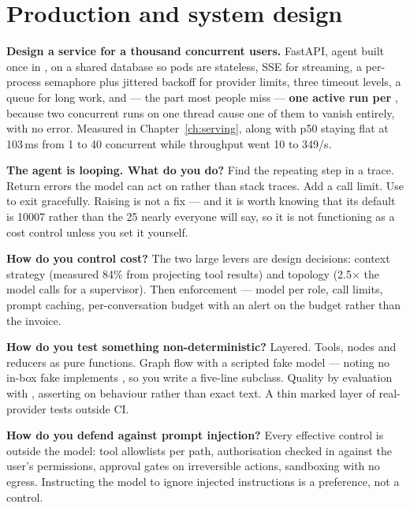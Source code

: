 \section{Production and system design}
\label{sec:appD-production}

\textbf{Design a service for a thousand concurrent users.} FastAPI, agent built
once in ,  on a shared database so pods
are stateless, SSE for streaming, a per-process semaphore plus jittered backoff
for provider limits, three timeout levels, a queue for long work, and --- the
part most people miss --- \textbf{one active run per }, because
two concurrent runs on one thread cause one of them to vanish entirely, with no
error. Measured in Chapter~\ref{ch:serving}, along with p50 staying flat at
103\,ms from 1 to 40 concurrent while throughput went 10 to 349/s.

\textbf{The agent is looping. What do you do?} Find the repeating step in a
trace. Return errors the model can act on rather than stack traces. Add a call
limit. Use  to exit gracefully. Raising
 is not a fix --- and it is worth knowing that its
default is 10007 rather than the 25 nearly everyone will say, so it is not
functioning as a cost control unless you set it yourself.

\textbf{How do you control cost?} The two large levers are design decisions:
context strategy (measured 84\% from projecting tool results) and topology
(2.5$\times$ the model calls for a supervisor). Then enforcement --- model per
role, call limits, prompt
caching, per-conversation budget with an alert on the budget rather than the
invoice.

\textbf{How do you test something non-deterministic?} Layered. Tools, nodes and
reducers as pure functions. Graph flow with a scripted fake model --- noting no
in-box fake implements , so you write a five-line subclass.
Quality by evaluation with , asserting on behaviour rather
than exact text. A thin marked layer of real-provider tests outside CI.

\textbf{How do you defend against prompt injection?} Every effective control is
outside the model: tool allowlists per path, authorisation checked in
 against the user's permissions, approval gates on
irreversible actions, sandboxing with no egress. Instructing the model to ignore
injected instructions is a preference, not a control.

